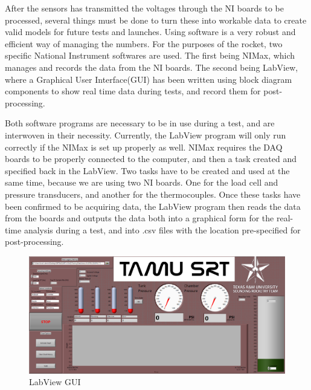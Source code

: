 \documentclass[10pt,a4paper]{article}
\begin{document}
\par After the sensors has transmitted the voltages through the NI boards to be processed, several things must be done to turn these into workable data to create valid models for future tests and launches. Using software is a very robust and efficient way of managing the numbers. For the purposes of the rocket, two specific National Instrument softwares are used. The first being NIMax, which manages and records the data from the NI boards. The second being LabView, where a Graphical User Interface(GUI) has been written using block diagram components to show real time data during tests, and record them for post-processing. 
\par Both software programs are necessary to be in use during a test, and are interwoven in their necessity. Currently, the LabView program will only run correctly if the NIMax is set up properly as well. NIMax requires the DAQ boards to be properly connected to the computer, and then a task created and specified back in the LabView. Two tasks have to be created and used at the same time, because we are using two NI boards. One for the load cell and pressure transducers, and another for the thermocouples. Once these tasks have been confirmed to be acquiring data, the LabView program then reads the data from the boards and outputs the data both into a graphical form for the real-time analysis during a test, and into .csv files with the location pre-specified for post-processing.
\newpage
\begin{figure}[h!]
	\centering
	\includegraphics[width=1\textwidth,keepaspectratio]{./figs/LVGUI.png}
	\caption{LabView GUI}
	\label{fig:This is a placeholder}
\end{figure}
\end{document}
